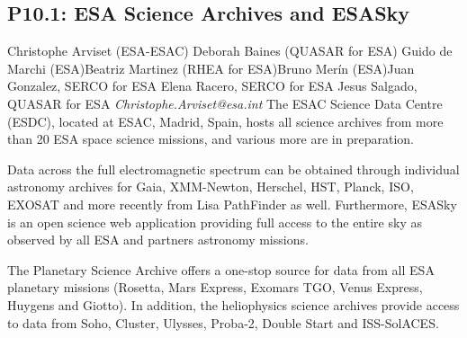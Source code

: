 \documentclass{report}
\begin{document}
\subsection*{P10.1: ESA Science Archives and ESASky}
\bigskip
Christophe Arviset (ESA-ESAC) \newline Deborah Baines (QUASAR for ESA) \newline  Guido de Marchi (ESA)\newline  Beatriz Martinez (RHEA for ESA)\newline Bruno Merín (ESA)\newline  Juan Gonzalez, SERCO for ESA
Elena Racero, SERCO for ESA
Jesus Salgado, QUASAR for ESA\newline\newline
{\it Christophe.Arviset@esa.int}\newline
\newline\newline
The ESAC Science Data Centre (ESDC), located at ESAC, Madrid, Spain, hosts all science archives from more than 20 ESA space science missions, and various more are in preparation. 

Data across the full electromagnetic spectrum can be obtained through individual astronomy archives for Gaia, XMM-Newton, Herschel, HST, Planck, ISO, EXOSAT and more recently from Lisa PathFinder as well. Furthermore, ESASky is an open science web application providing full access to the entire sky as observed by all ESA and partners astronomy missions.

The Planetary Science Archive offers a one-stop source for data from all ESA planetary missions (Rosetta, Mars Express, Exomars TGO, Venus Express, Huygens and Giotto). In addition, the heliophysics science archives provide access to data from Soho, Cluster, Ulysses, Proba-2, Double Start and ISS-SolACES.\newline
\newpage
\end{document}
